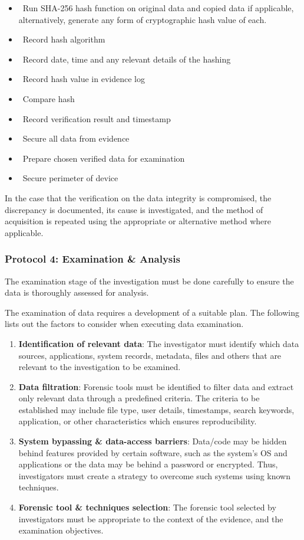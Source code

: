 \documentclass[a4paper]{report}
\newcommand{\checkbox}{\ding{113}}
\begin{document}
\begin{justify}
\begin{itemize}
    \item \checkbox\ Run SHA-256 hash function on original data and copied data if applicable, alternatively, generate any form of cryptographic hash value of each.
    \item \checkbox\ Record hash algorithm
    \item \checkbox\ Record date, time and any relevant details of the hashing
    \item \checkbox\ Record hash value in evidence log 
    \item \checkbox\ Compare hash 
    \item \checkbox\ Record verification result and timestamp 
    \item \checkbox\ Secure all data from evidence 
    \item \checkbox\ Prepare chosen verified data for examination
    \item \checkbox\ Secure perimeter of device 
\end{itemize}

In the case that the verification on the data integrity is compromised, the discrepancy is documented, its cause is investigated, and the method of acquisition is repeated using the appropriate or alternative method where applicable. 

\subsubsection{Protocol 4: Examination \& Analysis}

The examination stage of the investigation must be done carefully to ensure the data is thoroughly assessed for analysis. 

The examination of data requires a development of a suitable plan. The following lists out the factors to consider when executing data examination. 

\begin{enumerate}
    \item \textbf{Identification of relevant data}: The investigator must identify which data sources, applications, system records, metadata, files and others that are relevant to the investigation to be examined.
    \item \textbf{Data filtration}: Forensic tools must be identified to filter data and extract only relevant data through a predefined criteria. The criteria to be established may include file type, user details, timestamps, search keywords, application, or other characteristics which ensures reproducibility. 
    \item \textbf{System bypassing \& data-access barriers}: Data/code may be hidden behind features provided by certain software, such as the system’s OS and applications or the data may be behind a password or encrypted. Thus, investigators must create a strategy to overcome such systems using known techniques. 
    \item \textbf{Forensic tool \& techniques selection}: The forensic tool selected by investigators must be appropriate to the context of the evidence, and the examination objectives.
\end{enumerate}


\end{justify}
\end{document}
